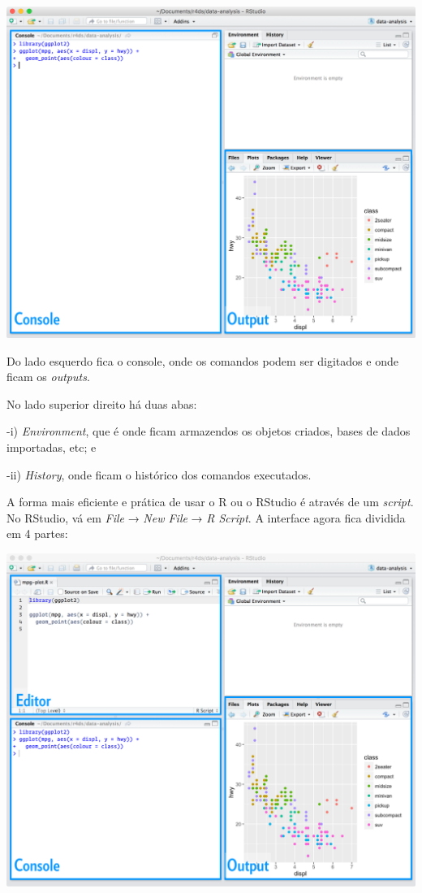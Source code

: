 \documentclass[]{book}
\begin{document}
\begin{center}\includegraphics[width=0.9\linewidth]{imagens/rstudio-console} \end{center}

Do lado esquerdo fica o console, onde os comandos podem ser digitados e onde ficam os \emph{outputs}.

No lado superior direito há duas abas:

-i) \emph{Environment}, que é onde ficam armazendos os objetos criados, bases de dados importadas, etc; e

-ii) \emph{History}, onde ficam o histórico dos comandos executados.

A forma mais eficiente e prática de usar o R ou o RStudio é através de um \emph{script}. No RStudio, vá em \emph{File} → \emph{New File} → \emph{R Script}. A interface agora fica dividida em 4 partes:

\begin{center}\includegraphics[width=0.9\linewidth]{imagens/rstudio-editor} \end{center}
\end{document}
